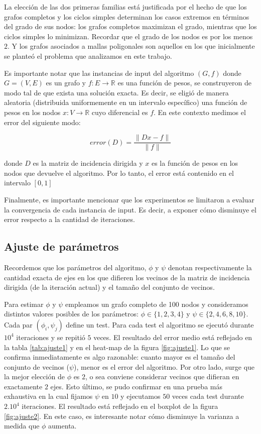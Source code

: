 \documentclass[conference,compsoc,a4paper]{IEEEtran}
\begin{document}
La elección de las dos primeras familias está justificada por el hecho 
de que los grafos completos y los ciclos simples determinan los casos 
extremos en términos del grado de sus nodos: los grafos completos 
maximizan el grado, mientras que los ciclos simples lo minimizan. 
Recordar que el grado de los nodos es por los menos $2$. Y los grafos 
asociados a mallas poligonales son aquellos en los que inicialmente se planteó 
el problema que analizamos en este trabajo.

\smallskip

Es importante notar que las instancias de input del algoritmo $(G,f)$ 
donde $G=(V,E)$ es un grafo y $f: E \rightarrow \mathbb{R}$ es una 
función de pesos, se construyeron de modo tal de que exista una 
solución exacta. Es decir, se 
eligió de manera aleatoria (distribuida uniformemente en un intervalo específico)
una función de pesos 
en los nodos $x: V \rightarrow \mathbb{R}$ cuyo diferencial 
es $f$. En este contexto medimos el error 
del siguiente modo:

$$error(D) = \frac{\|Dx-f\|}{\|f\|}$$

\noindent donde $D$ es la matriz de incidencia dirigida y $x$ es la función de 
pesos en los nodos que devuelve el algoritmo. Por lo tanto, el error 
está contenido en el intervalo $[0,1]$

\smallskip

Finalmente, es importante mencionar que los experimentos se limitaron a 
evaluar la convergencia de cada instancia de input. Es decir, a exponer 
cómo disminuye el error respecto a la cantidad de iteraciones.

\subsection{Ajuste de parámetros}

Recordemos que los parámetros del algoritmo, $\phi$ y $\psi$ denotan 
respectivamente la cantidad exacta de ejes en los que difieren los 
vecinos de la matriz de incidencia dirigida (de la iteración actual) y 
el tamaño del conjunto de vecinos.

\smallskip

Para estimar $\phi$ y $\psi$ empleamos un grafo completo de 100 
nodos y consideramos distintos valores posibles de los parámetros: 
$\phi \in \{1,2,3,4\}$ y $\psi \in \{2,4,6,8,10\}$. Cada par 
$(\phi_i, \psi_j)$ define un test. Para cada test el algoritmo se 
ejecutó durante $10^4$ iteraciones y se repitió $5$ veces. El resultado 
del error medio está reflejado en la tabla \ref{tab:ajuste1} y en el 
heat-map de la figura \ref{fig:ajuste1}. Lo que se confirma 
inmediatamente es algo razonable: cuanto mayor es el tamaño del 
conjunto de vecinos ($\psi$), menor es el error del algoritmo. Por 
otro lado, surge que la mejor elección de $\phi$ es $2$, o sea 
conviene considerar vecinos que difieran en exactamente $2$ ejes. Esto 
último, se pudo confirmar en una prueba más exhaustiva en la cual 
fijamos $\psi$ en $10$ y ejecutamos $50$ veces cada test durante 
$2 . 10^4$ iteraciones. El resultado está reflejado en el boxplot de la 
figura \ref{fig:ajuste2}. En este caso, es interesante notar cómo 
disminuye la varianza a medida que $\phi$ aumenta.
\end{document}
